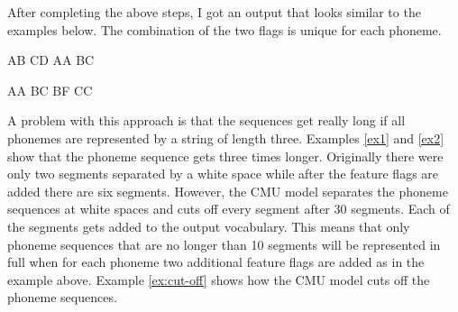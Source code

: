 After completing the above steps, I got an output that looks similar to the examples below. The combination of the two flags is unique for each phoneme.  

\begin{covexamples}
\item \label{ex1}  AB CD  AA BC
\item \label{ex2}  AA BC   BF CC
\end{covexamples}

A problem with this approach is that the sequences get really long if all phonemes are represented by a string of length three.  Examples \ref{ex1} and \ref{ex2} show that the phoneme sequence gets three times longer. Originally there were only two segments separated by a white space while after the feature flags are added there are six segments. However, the CMU model separates the  phoneme sequences at white spaces and cuts off every segment after 30 segments. Each of the segments gets added to the output vocabulary. This means that only phoneme sequences that are no longer than 10 segments will be represented in full when for each phoneme two additional feature flags are added as in the example above. Example \ref{ex:cut-off} shows how the CMU model cuts off the phoneme sequences.

